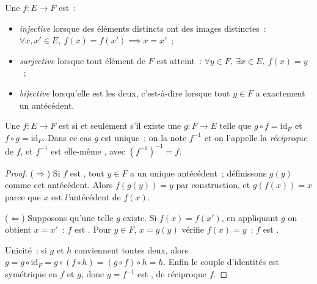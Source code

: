 \begin{definition}\label{def:b1:logic:inj}
Une  $f \colon E \to F$ est~:
\begin{itemize}
  \item \emph{injective} lorsque des éléments distincts
        ont des images distinctes~: $\forall x, x' \in E,\ f(x) = f(x')
        \implies x = x'$~;
  \item \emph{surjective} lorsque tout élément de $F$
        est atteint~: $\forall y \in F,\ \exists x \in E,\ f(x) = y$~;
  \item \emph{bijective} lorsqu'elle est les deux,
        c'est-à-dire lorsque tout $y \in F$ a exactement un antécédent.
\end{itemize}
\end{definition}

\begin{theorem}\label{thm:b1:logic:inverse}
Une  $f \colon E \to F$ est  si et seulement s'il
existe une  $g \colon F \to E$ telle que $g \circ f =
\mathrm{id}_E$ et $f \circ g = \mathrm{id}_F$. Dans ce cas $g$ est
unique~; on la note $f^{-1}$ et on l'appelle la \emph{réciproque} de
$f$, et $f^{-1}$ est elle-même , avec $(f^{-1})^{-1} = f$.
\end{theorem}

\begin{proof}
($\Rightarrow$) Si $f$ est , tout $y \in F$ a un unique
antécédent~; définissons $g(y)$ comme cet antécédent. Alors
$f(g(y)) = y$ par construction, et $g(f(x)) = x$ parce que $x$ est
\emph{l'}antécédent de $f(x)$.

($\Leftarrow$) Supposons qu'une telle $g$ existe. Si $f(x) = f(x')$, en
appliquant $g$ on obtient $x = x'$~: $f$ est . Pour $y \in F$,
$x = g(y)$ vérifie $f(x) = y$~: $f$ est .

Unicité~: si $g$ et $h$ conviennent toutes deux, alors $g = g \circ
\mathrm{id}_F = g \circ (f \circ h) = (g \circ f) \circ h = h$. Enfin
le couple d'identités est symétrique en $f$ et $g$, donc $g = f^{-1}$
est , de réciproque $f$.
\end{proof}

